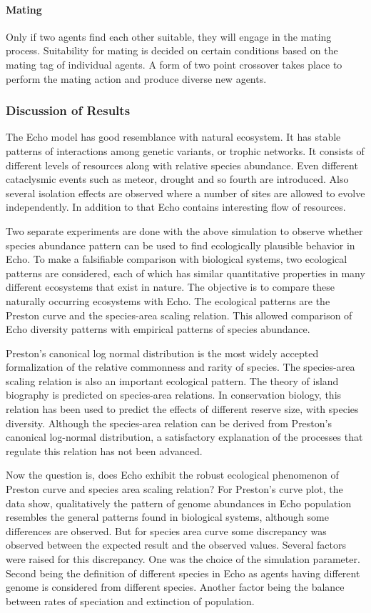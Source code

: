 \paragraph{Mating}
Only if two agents find each other suitable, they will engage in the mating process. Suitability for mating is decided on certain conditions based on the mating tag of individual agents. A form of two point crossover takes place to perform the mating action and produce diverse new agents. 

\subsubsection{Discussion of Results}
The Echo model has good resemblance with natural ecosystem. It has stable patterns of interactions among genetic variants, or trophic networks. It consists of different levels of resources along with relative species abundance. Even different cataclysmic events such as meteor, drought and so fourth are introduced. Also several isolation effects are observed where a number of sites are allowed to evolve independently. In addition to that Echo contains interesting flow of resources. 

Two separate experiments are done with the above simulation to observe whether species abundance pattern can be used to find ecologically plausible behavior in Echo. To make a falsifiable comparison with biological systems, two ecological patterns are considered, each of which has similar quantitative properties in many different ecosystems that exist in nature. The objective is to compare these naturally occurring ecosystems with Echo. The ecological patterns are the Preston  curve and the species-area scaling relation. This allowed comparison of Echo diversity patterns with empirical patterns of species abundance.

Preston's canonical log normal distribution is the most widely accepted formalization of the relative commonness and rarity of species. The species-area scaling relation is also an important ecological pattern. The theory of island biography is predicted on species-area relations. In conservation biology, this relation has been used to predict the effects of different reserve size, with species diversity. Although the species-area relation can be derived from Preston's canonical log-normal distribution, a satisfactory explanation of the processes that regulate this relation has not been advanced. 

Now the question is, does Echo exhibit the robust ecological phenomenon of Preston curve and species area scaling relation? For Preston's curve plot, the data show, qualitatively the pattern of genome abundances in Echo population resembles the general patterns found in biological systems, although some differences are observed. But for species area curve some discrepancy was observed between the expected result and the observed values. Several factors were raised for this discrepancy. One was the choice of the simulation parameter. Second being the definition of different species in Echo as agents having different genome is considered from different species. Another factor being the balance between rates of speciation and extinction of population. 

